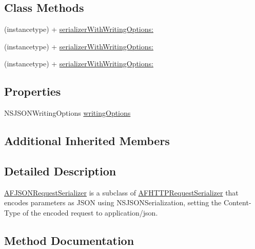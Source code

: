 \subsection*{Class Methods}
\begin{DoxyCompactItemize}
\item 
(instancetype) + \mbox{\hyperlink{interface_a_f_j_s_o_n_request_serializer_a53962511f37e48990159af5bc8959c30}{serializer\+With\+Writing\+Options\+:}}
\item 
(instancetype) + \mbox{\hyperlink{interface_a_f_j_s_o_n_request_serializer_a53962511f37e48990159af5bc8959c30}{serializer\+With\+Writing\+Options\+:}}
\item 
(instancetype) + \mbox{\hyperlink{interface_a_f_j_s_o_n_request_serializer_a53962511f37e48990159af5bc8959c30}{serializer\+With\+Writing\+Options\+:}}
\end{DoxyCompactItemize}
\subsection*{Properties}
\begin{DoxyCompactItemize}
\item 
N\+S\+J\+S\+O\+N\+Writing\+Options \mbox{\hyperlink{interface_a_f_j_s_o_n_request_serializer_ab69cc530353247cdd51d60279acc4e55}{writing\+Options}}
\end{DoxyCompactItemize}
\subsection*{Additional Inherited Members}


\subsection{Detailed Description}
{\ttfamily \mbox{\hyperlink{interface_a_f_j_s_o_n_request_serializer}{A\+F\+J\+S\+O\+N\+Request\+Serializer}}} is a subclass of {\ttfamily \mbox{\hyperlink{interface_a_f_h_t_t_p_request_serializer}{A\+F\+H\+T\+T\+P\+Request\+Serializer}}} that encodes parameters as J\+S\+ON using {\ttfamily N\+S\+J\+S\+O\+N\+Serialization}, setting the {\ttfamily Content-\/\+Type} of the encoded request to {\ttfamily application/json}. 

\subsection{Method Documentation}
\mbox{\label{interface_a_f_j_s_o_n_request_serializer_a53962511f37e48990159af5bc8959c30}} 
